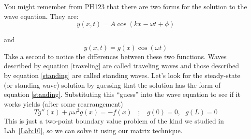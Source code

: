 You might remember from PH123 that there are two forms for the
solution to the wave equation.  They are:
\begin{equation}\label{traveling}
    y(x,t) = A \cos (k x - \omega t + \phi)
\end{equation}

and
\begin{equation}\label{standing}
    y(x,t) = g(x) \cos (\omega t)
\end{equation}
Take a second to notice the differences between these two functions.
Waves described by equation \eqref{traveling} are called traveling
waves and those described by equation \eqref{standing} are called
standing waves.  Let's look for the steady-state (or standing wave)
solution by guessing that the solution has the form of
equation \eqref{standing}.  Substituting this ``guess'' into the wave
equation to see if it works yields (after some rearrangement)
\begin{equation}
    T g''(x) + \mu \omega^2 g(x) = -f(x)~~~~;
    ~~~~g(0)=0,~~~g(L)=0
    \label{steady}
\end{equation}
This is just a two-point boundary value problem of the kind we
studied in Lab~\ref{Lab:10}, so we can solve it using our matrix
technique.


